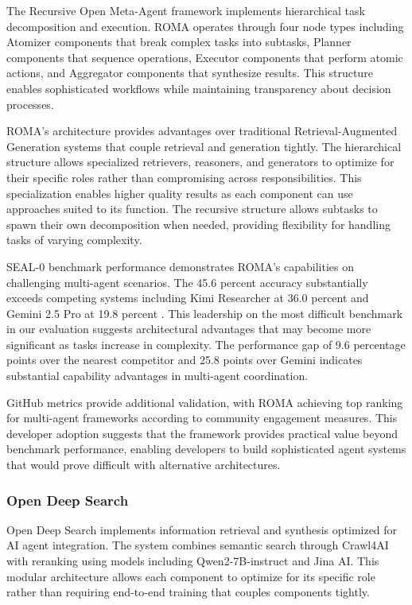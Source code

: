 The Recursive Open Meta-Agent framework implements hierarchical task decomposition and execution. ROMA operates through four node types including Atomizer components that break complex tasks into subtasks, Planner components that sequence operations, Executor components that perform atomic actions, and Aggregator components that synthesize results. This structure enables sophisticated workflows while maintaining transparency about decision processes.

ROMA's architecture provides advantages over traditional Retrieval-Augmented Generation systems that couple retrieval and generation tightly. The hierarchical structure allows specialized retrievers, reasoners, and generators to optimize for their specific roles rather than compromising across responsibilities. This specialization enables higher quality results as each component can use approaches suited to its function. The recursive structure allows subtasks to spawn their own decomposition when needed, providing flexibility for handling tasks of varying complexity.

SEAL-0 benchmark performance demonstrates ROMA's capabilities on challenging multi-agent scenarios. The 45.6 percent accuracy substantially exceeds competing systems including Kimi Researcher at 36.0 percent and Gemini 2.5 Pro at 19.8 percent \cite{roma_twitter2025}. This leadership on the most difficult benchmark in our evaluation suggests architectural advantages that may become more significant as tasks increase in complexity. The performance gap of 9.6 percentage points over the nearest competitor and 25.8 points over Gemini indicates substantial capability advantages in multi-agent coordination.

GitHub metrics provide additional validation, with ROMA achieving top ranking for multi-agent frameworks according to community engagement measures. This developer adoption suggests that the framework provides practical value beyond benchmark performance, enabling developers to build sophisticated agent systems that would prove difficult with alternative architectures.

\subsubsection{Open Deep Search}

Open Deep Search implements information retrieval and synthesis optimized for AI agent integration. The system combines semantic search through Crawl4AI with reranking using models including Qwen2-7B-instruct and Jina AI. This modular architecture allows each component to optimize for its specific role rather than requiring end-to-end training that couples components tightly.

